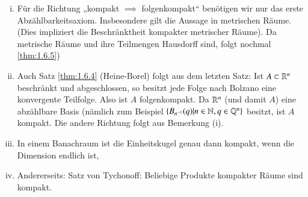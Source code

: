 \documentclass[a4paper,10pt]{scrartcl}
\begin{document}
\begin{note*}
 \begin{enumerate}[(i)]
  \item Für die Richtung „kompakt $\implies$ folgenkompakt“ benötigen wir nur das erste Abzählbarkeitsaxiom. 
Insbesondere gilt die Aussage in metrischen Räume.  
(Dies impliziert die Beschränktheit kompakter metrischer Räume). Da metrische Räume und ihre Teilmengen Hausdorff sind, folgt nochmal \ref{thm:1.6.5})
\item Auch Satz \ref{thm:1.6.4} (Heine-Borel) folgt aus dem letzten Satz: Ist $A\subset \mathbb{R}^n$ beschränkt und abgeschlossen, so besitzt jede Folge nach Bolzano eine konvergente Teilfolge.
Also ist $A$ folgenkompakt. Da $\mathbb{R}^n$ (und damit $A$) eine abzählbare Basis (nämlich zum Beispiel $\{B_{n^{-1}} (q)|n\in \mathbb{N}, q\in \mathbb{Q}^n\}$ besitzt,
ist $A$ kompakt. Die andere Richtung folgt aus Bemerkung (i).
\item In einem Banachraum ist die Einheitskugel genau dann kompakt, wenn die Dimension endlich ist,
\item Andererseits: Satz von Tychonoff: Beliebige Produkte kompakter Räume sind kompakt.
 \end{enumerate}
\end{note*}
\end{document}
